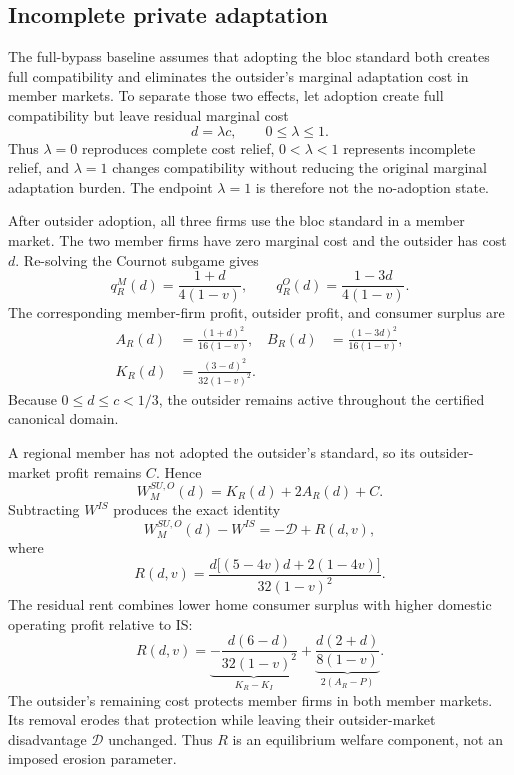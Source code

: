 \subsection{Incomplete private adaptation}
\label{subsec:partial-adaptation}

The full-bypass baseline assumes that adopting the bloc standard both creates full compatibility and eliminates the outsider's marginal adaptation cost in member markets. To separate those two effects, let adoption create full compatibility but leave residual marginal cost
\begin{equation}
    d=\lambda c,
    \qquad
    0\leq\lambda\leq1.
    \label{eq:residual-cost-definition}
\end{equation}
Thus $\lambda=0$ reproduces complete cost relief, $0<\lambda<1$ represents incomplete relief, and $\lambda=1$ changes compatibility without reducing the original marginal adaptation burden. The endpoint $\lambda=1$ is therefore not the no-adoption state.

After outsider adoption, all three firms use the bloc standard in a member market. The two member firms have zero marginal cost and the outsider has cost $d$. Re-solving the Cournot subgame gives
\begin{equation}
    q_R^M(d)=\frac{1+d}{4(1-v)},
    \qquad
    q_R^O(d)=\frac{1-3d}{4(1-v)}.
    \label{eq:partial-erosion-quantities}
\end{equation}
The corresponding member-firm profit, outsider profit, and consumer surplus are
\begin{align}
A_R(d)&=\frac{(1+d)^2}{16(1-v)},&
B_R(d)&=\frac{(1-3d)^2}{16(1-v)},\nonumber\\
    K_R(d)&=\frac{(3-d)^2}{32(1-v)^2}.
    \label{eq:partial-erosion-blocks}
\end{align}
Because $0\leq d\leq c<1/3$, the outsider remains active throughout the certified canonical domain.

A regional member has not adopted the outsider's standard, so its outsider-market profit remains $C$. Hence
\begin{equation}
    W_M^{SU,O}(d)
    =
    K_R(d)+2A_R(d)+C.
    \label{eq:partial-erosion-welfare}
\end{equation}
Subtracting $W^{IS}$ produces the exact identity
\begin{equation}
    \boxed{
    W_M^{SU,O}(d)-W^{IS}
    =
    -\mathscr D+R(d,v),
    }
    \label{eq:partial-erosion-identity}
\end{equation}
where
\begin{equation}
    \boxed{
    R(d,v)
    =
    \frac{d\bigl[(5-4v)d+2(1-4v)\bigr]}
         {32(1-v)^2}.
    }
    \label{eq:residual-rent}
\end{equation}
The residual rent combines lower home consumer surplus with higher domestic operating profit relative to IS:
\[
R(d,v)=\underbrace{-\frac{d(6-d)}{32(1-v)^2}}_{K_R-K_I}
       +\underbrace{\frac{d(2+d)}{8(1-v)}}_{2(A_R-P)}.
\]
The outsider's remaining cost protects member firms in both member markets. Its removal erodes that protection while leaving their outsider-market disadvantage $\mathscr D$ unchanged. Thus $R$ is an equilibrium welfare component, not an imposed erosion parameter.


